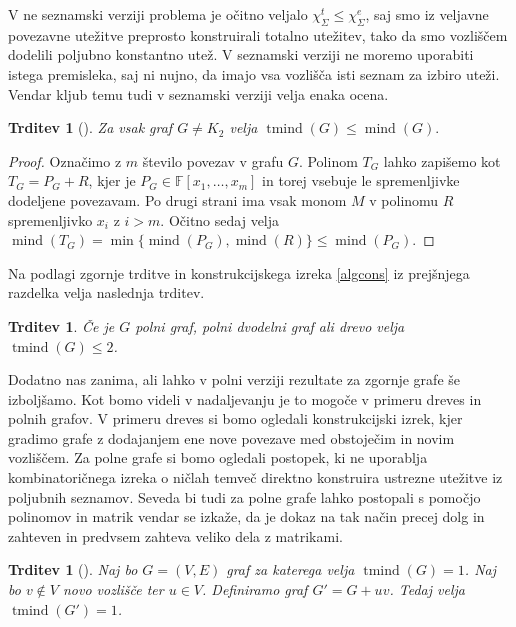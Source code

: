 \documentclass[12pt,a4paper,twoside]{article}
\theoremstyle{definition} %
\theoremstyle{plain} %
\newtheorem{trditev}[definicija]{Trditev}
\newcommand{\ec}{\chi_{\Sigma}^e}
\newcommand{\ect}{\chi_{\Sigma}^t}
\numberwithin{equation}{section}  %
\DeclareMathOperator{\mind}{mind}
\DeclareMathOperator{\tmind}{tmind}
\begin{document}
V ne seznamski verziji problema je očitno veljalo $\ect \le \ec$, saj smo iz veljavne povezavne utežitve preprosto konstruirali totalno utežitev, tako da smo vozliščem dodelili poljubno konstantno utež. V seznamski verziji ne moremo uporabiti istega premisleka, saj ni nujno, da imajo vsa vozlišča isti seznam za izbiro uteži. Vendar kljub temu tudi v seznamski verziji velja enaka ocena.
\begin{trditev}[\citet{algebraic}]
Za vsak graf $G \neq K_2$ velja $\tmind(G) \le \mind(G).$
\end{trditev}
\begin{proof}
Označimo z $m$ število povezav v grafu $G$. Polinom $T_G$ lahko zapišemo kot $T_G = P_G + R$, kjer je $P_G \in \mathbb{F}[x_1, \ldots, x_m]$ in torej vsebuje le spremenljivke dodeljene povezavam. Po drugi strani ima vsak monom $M$ v polinomu $R$ spremenljivko $x_i$ z $i > m$. Očitno sedaj velja $\mind(T_G) = \min \{\mind(P_G),\mind(R)\} \le \mind(P_G)$.
\end{proof}
Na podlagi zgornje trditve in konstrukcijskega izreka \ref{algcons} iz prejšnjega razdelka velja naslednja trditev.
\begin{trditev}
Če je $G$ polni graf, polni dvodelni graf ali drevo velja $\tmind(G) \le 2$.
\end{trditev}
Dodatno nas zanima, ali lahko v polni verziji rezultate za zgornje grafe še izboljšamo. Kot bomo videli v nadaljevanju je to mogoče v primeru dreves in polnih grafov. V primeru dreves si bomo ogledali konstrukcijski izrek, kjer gradimo grafe z dodajanjem ene nove povezave med obstoječim in novim  vozliščem. Za polne grafe si bomo ogledali postopek, ki ne uporablja kombinatoričnega izreka o ničlah temveč direktno konstruira ustrezne utežitve iz poljubnih seznamov. Seveda bi tudi za polne grafe lahko postopali s pomočjo polinomov in matrik vendar se izkaže, da je dokaz na tak način precej dolg in zahteven in predvsem zahteva veliko dela z matrikami.
\begin{trditev}[\citet{algebraic}]
\label{list_t_tree}
Naj bo $G=(V,E)$ graf za katerega velja $\tmind(G) = 1$. Naj bo $v \notin V$ novo vozlišče ter $u \in V$. Definiramo graf $G' = G + uv$. Tedaj velja $\tmind(G') =1$.
\end{trditev}
\end{document}
